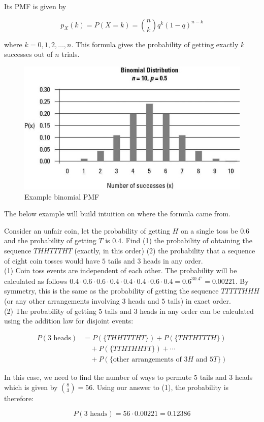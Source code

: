 \documentclass[12pt, a4paper]{article}
\newcounter{exa}
\begin{document}
Its PMF is given by

$$p_X(k)=P(X=k)={n \choose k} q^k(1-q)^{n-k}$$

where $k=0, 1, 2, \dots, n$. This formula gives the probability of getting exactly $k$ successes out of $n$ trials. \\

\begin{figure}[H]
\centering
\includegraphics[width=120mm]{10.jpg}
\caption{Example binomial PMF}
\end{figure}

The below example will build intuition on where the formula came from.

\begin{texample}
Consider an unfair coin, let the probability of getting $H$ on a single toss be $0.6$ and the probability of getting $T$ is $0.4$. Find (1) the probability of obtaining the sequence $THHTTTHT$ (exactly, in this order) (2) the probability that a sequence of eight coin tosses would have $5$ tails and $3$ heads in any order. \\

(1) Coin toss events are independent of each other. The probability will be calculated as follows $0.4\cdot0.6\cdot0.6\cdot0.4\cdot0.4\cdot0.4\cdot0.6\cdot0.4=0.6^30.4^5=0.00221$. By symmetry, this is the same as the probability of getting the sequence $TTTTTHHH$ (or any other arrangements involving $3$ heads and $5$ tails) in exact order. \\

(2) The probability of getting $5$ tails and $3$ heads in any order can be calculated using the addition law for disjoint events:

\begin{align*}
P(\text{$3$ heads})&=P(\{THHTTTHT\}) + P(\{THTHTTTH\}) \\
&\quad+ P(\{TTHTHHTT\}) + \cdots \\
&\quad + P(\{\text{other arrangements of $3H$ and $5T$}\})
\end{align*}

In this case, we need to find the number of ways to permute $5$ tails and $3$ heads which is given by $\binom{8}{3}=56$. Using our answer to (1), the probability is therefore:

$$P(\text{$3$ heads})=56\cdot0.00221=0.12386$$
\end{texample}
\end{document}
